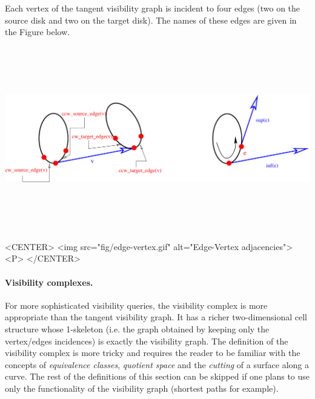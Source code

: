 Each vertex of the tangent visibility graph is incident to four edges (two
on the source disk and two on the target disk). The names of these edges
are given in the Figure below.
\begin{ccTexOnly}
    \begin{center}
        \includegraphics[height=8cm,width=\linewidth]{Visibility_complex_2/fig/edge-vertex}%
    \end{center}
\end{ccTexOnly}

\begin{ccHtmlOnly}
    <CENTER>
        <img src="fig/edge-vertex.gif" alt="Edge-Vertex adjacencies"><P>
    </CENTER>
\end{ccHtmlOnly}

\paragraph{Visibility complexes. }\label{VC2-vcdef}
For more sophisticated visibility queries, the visibility complex is more
appropriate than the tangent visibility graph. It has a richer
two-dimensional cell structure whose 1-skeleton (i.e. the graph obtained by
keeping only the vertex/edges incidences) is exactly the visibility
graph. The definition of the visibility complex is more tricky and requires
the reader to be familiar with the concepts of \emph{equivalence classes},
\emph{quotient space} and the \emph{cutting} of a surface along a
curve. The rest of the definitions of this section can be skipped if one
plans to use only the functionality of the visibility graph (shortest paths
for example).

